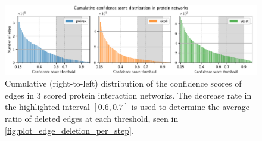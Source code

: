 \begin{figure}
    \includegraphics[width=\linewidth]{plot_cumulative_confidence_scores.pdf}
    \vspace*{-0.6cm}
    \caption{Cumulative (right-to-left) distribution of the confidence scores of edges in 3 scored protein interaction networks.
    The decrease rate in the highlighted interval $[0.6,0.7]$ is used to determine the average ratio of deleted edges at each threshold, seen in \autoref{fig:plot_edge_deletion_per_step}.}
    \label{fig:plot_cumulative_confidence_scores}
\end{figure}
